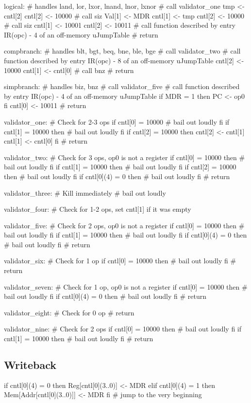 \documentclass[12pt]{article}
\begin{document}
\begin{verbatimtab}
logical: # handles land, lor, lxor, lnand, lnor, lxnor
	# call validator_one
	tmp <- cntl[2]
	cntl[2] <- 10000
	# call siz
	Val[1] <- MDR
	cntl[1] <- tmp
	cntl[2] <- 10000
	# call siz
	cntl[1] <- 10001
	cntl[2] <- 10011
	# call function described by entry IR(opc) - 4 of an off-memory uJumpTable
	# return

compbranch: # handles blt, bgt, beq, bne, ble, bge
	# call validator_two
	# call function described by entry IR(opc) - 8 of an off-memory uJumpTable
	cntl[2] <- 10000
	cntl[1] <- cntl[0]
	# call bnz
	# return

simpbranch: # handles biz, bnz
	# call validator_five
	# call function described by entry IR(opc) - 4 of an off-memory uJumpTable
	if MDR = 1 then
		PC <- op0
	fi
	cntl[0] <- 10011
	# return

validator_one:
	# Check for 2-3 ops
	if cntl[0] = 10000
		# bail out loudly
	fi
	if cntl[1] = 10000 then
		# bail out loudly
	fi
	if cntl[2] = 10000 then
		cntl[2] <- cntl[1]
		cntl[1] <- cntl[0]
	fi
	# return

validator_two:
	# Check for 3 ops, op0 is not a register
	if cntl[0] = 10000 then
		# bail out loudly
	fi
	if cntl[1] = 10000 then
		# bail out loudly
	fi
	if cntl[2] = 10000 then
		# bail out loudly
	fi
	if cntl[0](4) = 0 then
		# bail out loudly
	fi
	# return

validator_three:
	# Kill immediately
	# bail out loudly

validator_four:
	# Check for 1-2 ops, set cntl[1] if it was empty

validator_five:
	# Check for 2 ops, op0 is not a register
	if cntl[0] = 10000 then
		# bail out loudly
	fi
	if cntl[1] = 10000 then
		# bail out loudly
	fi
	if cntl[0](4) = 0 then
		# bail out loudly
	fi
	# return

validator_six:
	# Check for 1 op
	if cntl[0] = 10000 then
		# bail out loudly
	fi
	# return

validator_seven:
	# Check for 1 op, op0 is not a register
	if cntl[0] = 10000 then
		# bail out loudly
	fi
	if cntl[0](4) = 0 then
		# bail out loudly
	fi
	# return

validator_eight:
	# Check for 0 op
	# return

validator_nine:
	# Check for 2 ops
	if cntl[0] = 10000 then
		# bail out loudly
	fi
	if cntl[1] = 10000 then
		# bail out loudly
	fi
	# return
\end{verbatimtab}

\subsection{Writeback}
\begin{verbatimtab}
if cntl[0](4) = 0 then
	Reg[cntl[0](3..0)] <- MDR
elif cntl[0](4) = 1 then
	Mem[Addr[cntl[0](3..0)]] <- MDR
fi
# jump to the very beginning
\end{verbatimtab}
\end{document}

